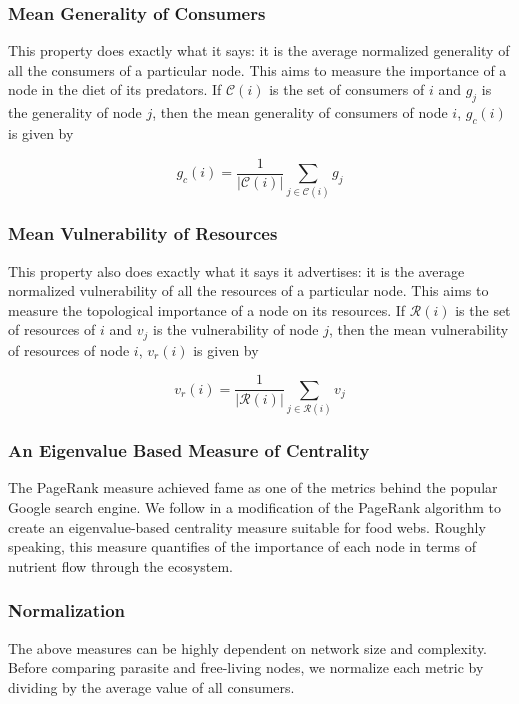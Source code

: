 \documentclass{article}
\begin{document}
\subsubsection{Mean Generality of Consumers} This property does exactly what it
says: it is the average normalized generality of all the consumers of a
particular node. This aims to measure the importance of a node in the diet of
its predators. If $\mathcal{C}(i)$ is the set of consumers of $i$ and $g_j$ is
the generality of node $j$, then the mean generality of consumers of node $i$,
$g_c(i)$ is given by

\begin{equation} 
    g_c(i) = \frac{1}{|\mathcal{C}(i)|}\sum_{j\in\mathcal{C}(i)}g_j
\label{eq:MeanGeneralityConsumers} 
\end{equation}

\subsubsection{Mean Vulnerability of Resources} This property also does exactly
what it says it advertises: it is the average normalized vulnerability of all
the resources of a particular node. This aims to measure the topological
importance of a node on its resources. If $\mathcal{R}(i)$ is the set of
resources of $i$ and $v_j$ is the vulnerability of node $j$, then the mean
vulnerability of resources of node $i$, $v_r(i)$ is given by

\begin{equation} 
    v_r(i) = \frac{1}{|\mathcal{R}(i)|}\sum_{j\in\mathcal{R}(i)}v_j
\label{eq:MeanVulnerabilityResources}  
\end{equation}

\subsubsection{An Eigenvalue Based Measure of Centrality} The PageRank measure
achieved fame as one of the metrics behind the popular Google search engine. We
follow \cite{Allesina2009} in a modification of the PageRank algorithm to
create an eigenvalue-based centrality measure suitable for food webs.  Roughly
speaking, this measure quantifies of the importance of each node in terms of
nutrient flow through the ecosystem.

\subsubsection{Normalization} The above measures can be highly dependent on
network size and complexity. Before comparing parasite and free-living nodes,
we normalize each metric by dividing by the average value of all consumers.
\end{document}
